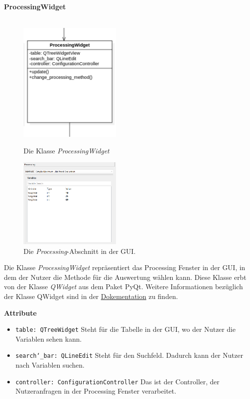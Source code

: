 \documentclass{article}
\begin{document}
\newpage
\textbf{\large{ProcessingWidget}}\\\\
\begin{figure}[H]%
    \centering
    \begin{minipage}[b]{0.4\textwidth}
        \includegraphics[width=5cm]{entwurf/Entwurf_dokument/img/Alissa/ProcessingWidget.png}
        \caption{Die Klasse \textit{ProcessingWidget}}
    \end{minipage}
    \hfill
    \begin{minipage}[b]{0.4\textwidth}
        \includegraphics[width=5cm]{entwurf/Entwurf_dokument/img/Alissa/Processing.png} 
    \caption{Die \textit{Processing}-Abschnitt in der GUI.}
    \end{minipage}
\end{figure}
Die Klasse \textit{ProcessingWidget} repräsentiert das Processing Fenster in der GUI, in dem der Nutzer die Methode für die Auswertung wählen kann. Diese Klasse erbt von der Klasse \textit{QWidget} aus dem Paket PyQt. Weitere Informationen bezüglich der Klasse QWidget sind in der \href{https://doc.qt.io/qt-6/qwidget.html}{Dokementation} zu finden.
\newline \newline

\textbf{{Attribute}}
\begin{itemize}
\item \texttt{table: QTreeWidget} \newline Steht für die Tabelle in der GUI, wo der Nutzer die Variablen sehen kann.
\item \texttt{search\char`_bar: QLineEdit} \newline Steht für den Suchfeld. Dadurch kann der Nutzer nach Variablen suchen.
\item \texttt{controller: ConfigurationController} \newline Das ist der Controller, der Nutzeranfragen in der Processing Fenster verarbeitet.
\end{itemize}
\end{document}
